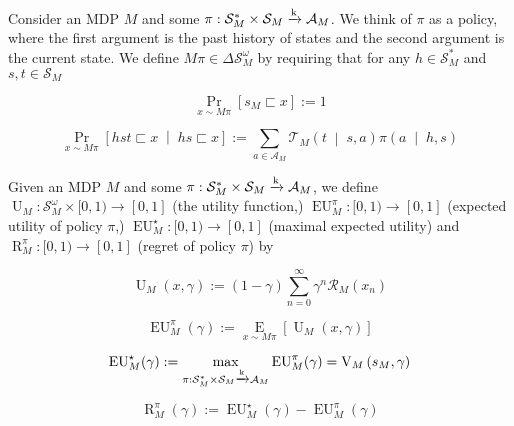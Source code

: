 \documentclass[anon,12pt]{colt2018} %
\newcommand{\Comment}[1]{}
\newcommand{\AP}[1]{\left(#1\right)}
\newcommand{\AB}[1]{\left[#1\right]}
\newcommand{\APM}[2]{\left(#1\;\middle\vert\;#2\right)}
\newcommand{\ABM}[2]{\left[#1\;\middle\vert\;#2\right]}
\newcommand{\Pa}[2]{\underset{#1}{\operatorname{Pr}}\AB{#2}}
\newcommand{\CP}[3]{\underset{#1}{\operatorname{Pr}}\ABM{#2}{#3}}
\newcommand{\Ea}[2]{\underset{#1}{\operatorname{E}}\AB{#2}}
\newcommand{\K}{\xrightarrow{\textnormal{k}}}
\newcommand{\A}{\mathcal{A}}
\newcommand{\St}{\mathcal{S}}
\newcommand{\T}{\mathcal{T}}
\newcommand{\R}{\mathcal{R}}
\newcommand{\Ut}{\operatorname{U}}
\newcommand{\V}{\operatorname{V}}
\newcommand{\EU}{\operatorname{EU}}
\newcommand{\Rg}{\operatorname{R}}
\newcommand{\MP}[2]{#1#2}
\begin{document}
\begin{samepage}
\begin{definition}

Consider an MDP $M$ and some $\pi: \St_M^* \times \St_M \K \A_M$. We think of $\pi$ as a policy, where the first argument is the past history of states and the second argument is the current state. We define $\MP{M}{\pi} \in \Delta\St_M^\omega$ by requiring that for any $h \in \St_M^*$ and $s,t \in \St_M$

\begin{equation}
\Pa{x\sim\MP{M}{\pi}}{s_M \sqsubset x} := 1
\end{equation}


\begin{equation}
\CP{x\sim\MP{M}{\pi}}{hst \sqsubset x}{hs \sqsubset x} := \sum_{a \in \A_M} {\T_M\APM{t}{s,a} \pi\APM{a}{h,s}}
\end{equation}

\Comment{In other words, $\MP{M}{\pi}$ is the probability measure over histories resulting from policy $\pi$ interacting with environment $M$.}

\end{definition}
\end{samepage}

\begin{samepage}
\begin{definition}
\label{def:utility}

Given an MDP $M$ and some $\pi: \St_M^* \times \St_M \K \A_M$, we define $\Ut_M: \St_M^\omega \times [0,1) \rightarrow [0,1]$ (the utility function,) $\EU_M^\pi: [0,1) \rightarrow [0,1]$ (expected utility of policy $\pi$,) $\EU_M^\star: [0,1) \rightarrow [0,1]$ (maximal expected utility) and $\Rg_M^\pi:[0,1)\rightarrow[0,1]$ (regret of policy $\pi$) by

\begin{equation}
\Ut_M(x,\gamma) := (1-\gamma)\sum_{n=0}^\infty {\gamma^n \R_M\AP{x_n}}
\end{equation}

\begin{equation}
\EU_M^\pi(\gamma) := \Ea{x\sim\MP{M}{\pi}}{\Ut_M(x,\gamma)}
\end{equation}

\begin{equation}
\EU_M^\star(\gamma):=\max_{\pi: \St_M^* \times \St_M \K \A_M} {\EU_M^\pi(\gamma)} = \V_M\AP{s_M,\gamma}
\end{equation}

\begin{equation}
\Rg_M^\pi(\gamma):=\EU_M^\star(\gamma)-\EU_M^\pi(\gamma)
\end{equation}

\end{definition}
\end{samepage}
\end{document}
